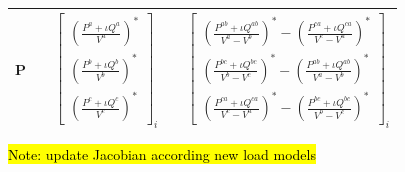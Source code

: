 \documentclass[10pt,journal]{article}
\begin{document}
\begin{table}[h]
\begin{adjustbox}{width=1\textwidth}
\begin{tabular}{ccccc}
P   &&  $ \begin{bmatrix} 
   (\frac{ P^a +\iota Q^a}{V^a})^*\\
    (\frac{ P^b +\iota Q^b}{V^b})^*\\
    (\frac{ P^c +\iota Q^c}{V^c})^*
    \end{bmatrix}_i $ &&   $  \begin{bmatrix}
   (\frac{ P^{ab} +\iota Q^{ab}}{V^a-V^b})^* - (\frac{ P^{ca} +\iota Q^{ca}}{V^c-V^a})^* \\
    (\frac{ P^{bc} +\iota Q^{bc}}{V^b-V^c})^* - (\frac{ P^{ab} +\iota Q^{ab}}{V^a-V^b})^*\\
    (\frac{ P^{ca} +\iota Q^{ca}}{V^c-V^a})^* - (\frac{ P^{bc} +\iota Q^{bc}}{V^b-V^c})^*
    \end{bmatrix}_i $ \\

\bottomrule
\end{tabular}
\end{adjustbox}
\end{table}
\hl{Note: update Jacobian according new load models}
\end{document}
